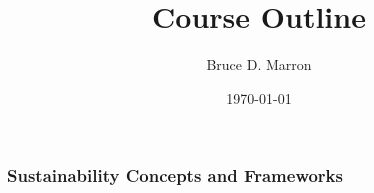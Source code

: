 \documentclass[12pt, letterpaper]{article}
\title{\vspace{-15mm}\fontsize{14pt}{10pt}
                    \selectfont \textbf{Course Outline}   %
                    \vspace{-7mm}
      }
\author{
     \normalsize Bruce D. Marron \\                     %
     \vspace{-5mm}
}
\date{\normalsize \today}
\begin{document}
\begin{singlespacing}
\end{singlespacing}
\thispagestyle{fancy}                           %


\setcounter{subsubsection}{2} %
\subsubsection{Sustainability Concepts and Frameworks}
\end{document}
